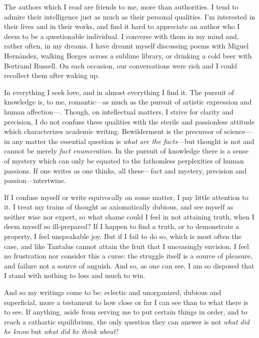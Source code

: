 \documentclass[a4paper, 12pt]{article}
\begin{document}
The authors which I read are friends to me, more than authorities. I tend to
admire their intelligence just as much as their personal qualities. I'm
interested in their lives and in their works, and find it hard to appreciate an
author who I deem to be a questionable individual. I converse with them in my
mind and, rather often, in my dreams. I have dreamt myself discussing poems
with Miguel Hernández, walking Borges across a sublime library, or drinking a
cold beer with Bertrand Russell. On each occasion, our conversations were rich
and I could recollect them after waking up.

In everything I seek love, and in almost everything I find it. The pursuit of
knowledge is, to me, romantic---as much as the pursuit of artistic expression
and human affection---. Though, on intellectual matters, I strive for clarity
and precision, I do not confuse these qualities with the sterile and
passionless attitude which characterizes academic writing. Bewilderment is
the precursor of science---in any matter the essential question is \textit{what
are the facts}---but thought is not and cannot be merely \textit{fact
enumeration}. In the pursuit of knowledge there is a sense of mystery which can
only be equated to the fathomless perplexities of human
passions. If one writes as one thinks, all these---fact and mystery, precision
and passion---intertwine.

If I confuse myself or write equivocally on some matter, I pay little attention
to it. I treat my trains of thought as axiomatically dubious, and see myself as
neither wise nor expert, so what shame could I feel in not attaining truth,
when I deem myself so ill-prepared? If I happen to find a truth, or to
demonstrate a property, I feel unspeakable joy. But if I fail to do so, which
is most often the case, and like Tantalus cannot attain the fruit that I
unceasingly envision, I feel no frustration nor consider this a curse: the
struggle itself is a source of pleasure, and failure not a source of anguish.
And so, as one can see, I am so disposed that I stand with nothing to loss and
much to win.

And so my writings come to be: eclectic and unorganized, dubious and
superficial, more a testament to how close or far I can see than to what there
is to see. If anything, aside from serving me to put certain things in order,
and to reach a cathartic equilibrium, the only question they can answer is not
\textit{what did he know} but \textit{what did he think about}?
\end{document}
